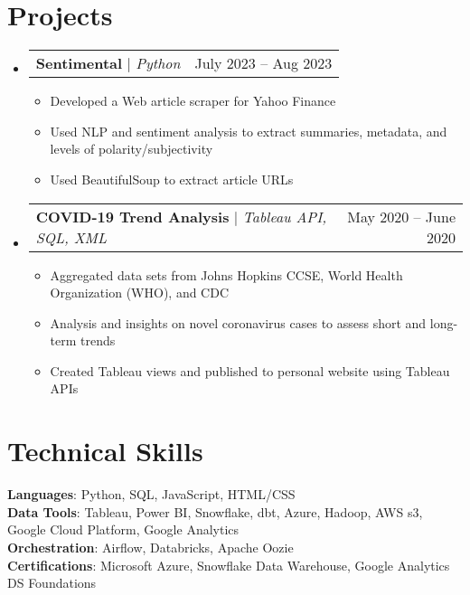 \documentclass[letterpaper,11pt]{article}
\makeatletter
\newcommand{\resumeItem}[1]{
  \item\small{
    {#1 \vspace{-2pt}}
  }
}
\newcommand{\resumeProjectHeading}[2]{
    \item
    \begin{tabular*}{0.97\textwidth}{l@{\extracolsep{\fill}}r}
      \small#1 & #2 \\
    \end{tabular*}\vspace{-7pt}
}
\newcommand{\resumeSubHeadingListStart}{\begin{itemize}[leftmargin=0.15in, label={}]}
\newcommand{\resumeSubHeadingListEnd}{\end{itemize}}
\newcommand{\resumeItemListStart}{\begin{itemize}}
\newcommand{\resumeItemListEnd}{\end{itemize}\vspace{-5pt}}
\makeatother
\begin{document}
\section{Projects}
    \resumeSubHeadingListStart
      \resumeProjectHeading
          {\textbf{Sentimental} $|$ \emph{Python}}{July 2023 -- Aug 2023}
          \resumeItemListStart
            \resumeItem{Developed a Web article scraper for Yahoo Finance}
            \resumeItem{Used NLP and sentiment analysis to extract summaries, metadata, and levels of polarity/subjectivity}
            \resumeItem{Used BeautifulSoup to extract article URLs}
          \resumeItemListEnd
      \resumeProjectHeading
          {\textbf{COVID-19 Trend Analysis} $|$ \emph{Tableau API, SQL, XML}}{May 2020 -- June 2020}
          \resumeItemListStart
            \resumeItem{Aggregated data sets from Johns Hopkins CCSE, World Health Organization (WHO), and CDC}
            \resumeItem{Analysis and insights on novel coronavirus cases to assess short and long-term trends}
            \resumeItem{Created Tableau views and published to personal website using Tableau APIs}
          \resumeItemListEnd
    \resumeSubHeadingListEnd



%
\section{Technical Skills}
 \begin{itemize}[leftmargin=0.15in, label={}]
    \small{\item{
     \textbf{Languages}{: Python, SQL, JavaScript, HTML/CSS} \\
     \textbf{Data Tools}{: Tableau, Power BI, Snowflake, dbt, Azure, Hadoop, AWS s3, Google Cloud Platform, Google Analytics} \\
     \textbf{Orchestration}{: Airflow, Databricks, Apache Oozie} \\
     \textbf{Certifications}{: Microsoft Azure, Snowflake Data Warehouse, Google Analytics DS Foundations}
    }}
 \end{itemize}

 
\end{document}
